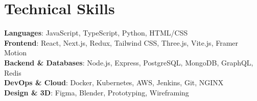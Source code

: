 \documentclass[11pt,a4paper]{article}
\begin{document}
\section{Technical Skills}
 \begin{itemize}[leftmargin=0.15in, label={}]
    \small{\item{
     \textbf{Languages}{: JavaScript, TypeScript, Python, HTML/CSS} \\
     \textbf{Frontend}{: React, Next.js, Redux, Tailwind CSS, Three.js, Vite.js, Framer Motion} \\
     \textbf{Backend \& Databases}{: Node.js, Express, PostgreSQL, MongoDB, GraphQL, Redis} \\
     \textbf{DevOps \& Cloud}{: Docker, Kubernetes, AWS, Jenkins, Git, NGINX} \\
     \textbf{Design \& 3D}{: Figma, Blender, Prototyping, Wireframing}
    }}
 \end{itemize}
\end{document}
